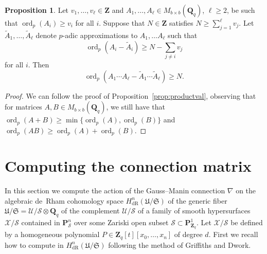 \documentclass[a4paper,11pt]{article}
\numberwithin{equation}{section}
\newcommand{\ZZ}{\mathbf{Z}} %
\newcommand{\QQ}{\mathbf{Q}} %
\DeclareMathOperator{\ord}{ord}          %
\providecommand{\HdR}{H_{\text{dR}}}    %
\theoremstyle{definition}
\newtheorem{prop}[thm]{Proposition}
\begin{document}
\begin{prop} \label{prop:matrixproductval}
Let $v_1,\dotsc,v_{\ell} \in \ZZ$ and 
$A_1, \dotsc, A_{\ell} \in M_{b \times b}(\QQ_q)$, $\ell \geq 2$, be 
such that $\ord_p(A_i) \geq v_i$ for all $i$. Suppose that $N \in \ZZ$ 
satisfies $N \geq \sum_{j=1}^{\ell} v_j$. 
Let $\tilde{A}_1, \dotsc, \tilde{A}_{\ell}$ denote $p$-adic approximations 
to $A_1, \dotsc A_{\ell}$ such that
\[
\ord_p(A_i - \tilde{A}_i) \geq N - \sum_{j \neq i} v_j
\]
for all $i$.  Then 
\begin{equation}
\ord_p(A_1 \dotsm A_{\ell} - \tilde{A}_1 \dotsm \tilde{A}_{\ell}) \geq N.
\end{equation}
\end{prop}

\begin{proof}
We can follow the proof of Proposition~\ref{prop:productval}, 
observing that for matrices $A,B \in M_{b \times b}(\QQ_q)$, we still 
have that $\ord_p(A + B) \geq \min \{\ord_p(A), \ord_p(B)\}$ and 
$\ord_p(AB) \geq \ord_p(A)+\ord_p(B)$.
\end{proof}

\section{Computing the connection matrix}
\label{sec:Connection}

In this section we compute the action of the Gauss--Manin connection $\nabla$ 
on the algebraic de~Rham cohomology space $\HdR^{n}(\mathfrak{U}/\mathfrak{S})$ 
of the generic fiber 
$\mathfrak{U}/\mathfrak{S}=\mathcal{U}/\mathcal{S} \otimes \QQ_q$ of the 
complement $\mathcal{U}/\mathcal{S}$ of a family of smooth hypersurfaces 
$\mathcal{X}/\mathcal{S}$ contained in $\mathbf{P}^n_{\mathcal{S}}$ over
some Zariski open subset $\mathcal{S} \subset \mathbf{P}^1_{\ZZ_q}$. Let 
$\mathcal{X}/\mathcal{S}$ be defined by a homogeneous polynomial 
$P \in \ZZ_q[t][x_0,\dotsc,x_n]$ of degree $d$. First we recall how to 
compute in $\HdR^{n}(\mathfrak{U}/\mathfrak{S})$ following the method 
of Griffiths and Dwork.  
\end{document}
